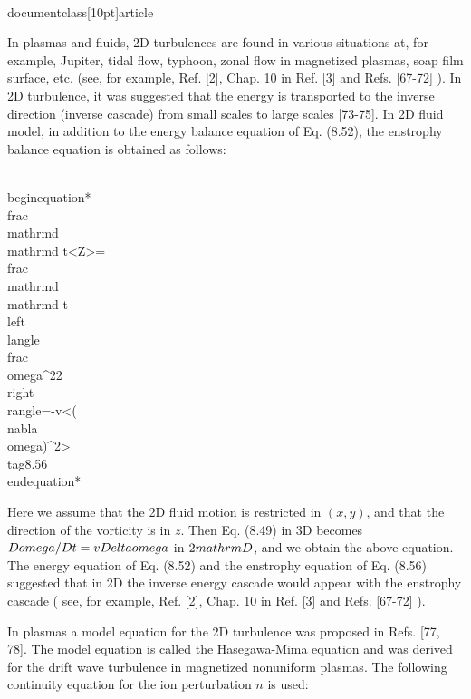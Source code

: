 \\documentclass[10pt]{article}
\begin{document}
{{{{{In plasmas and fluids, 2D turbulences are found in various situations at, for example, Jupiter, tidal flow, typhoon, zonal flow in magnetized plasmas, soap film surface, etc. (see, for example, Ref. [2], Chap. 10 in Ref. [3] and Refs. [67-72] ). In 2D turbulence, it was suggested that the energy is transported to the inverse direction (inverse cascade) from small scales to large scales [73-75]. In 2D fluid model, in addition to the energy balance equation of Eq. (8.52), the enstrophy balance equation is obtained as follows:


\\begin{equation*}
\\frac{\\mathrm{d}}{\\mathrm{d} t}<Z>=\\frac{\\mathrm{d}}{\\mathrm{d} t}\\left\\langle\\frac{\\omega^{2}}{2}\\right\\rangle=-v<(\\nabla \\omega)^{2}> \\tag{8.56}
\\end{equation*}


Here we assume that the 2D fluid motion is restricted in $(x, y)$, and that the direction of the vorticity is in $z$. Then Eq. (8.49) in 3D becomes $D \\omega / D t=v \\Delta \\omega$ in $2 \\mathrm{D}$, and we obtain the above equation. The energy equation of Eq. (8.52) and the enstrophy equation of Eq. (8.56) suggested that in 2D the inverse energy cascade would appear with the enstrophy cascade ( see, for example, Ref. [2], Chap. 10 in Ref. [3] and Refs. [67-72] ).

In plasmas a model equation for the 2D turbulence was proposed in Refs. [77, 78]. The model equation is called the Hasegawa-Mima equation and was derived for the drift wave turbulence in magnetized nonuniform plasmas. The following continuity equation for the ion perturbation $n$ is used:


}}}}}
\end{document}
